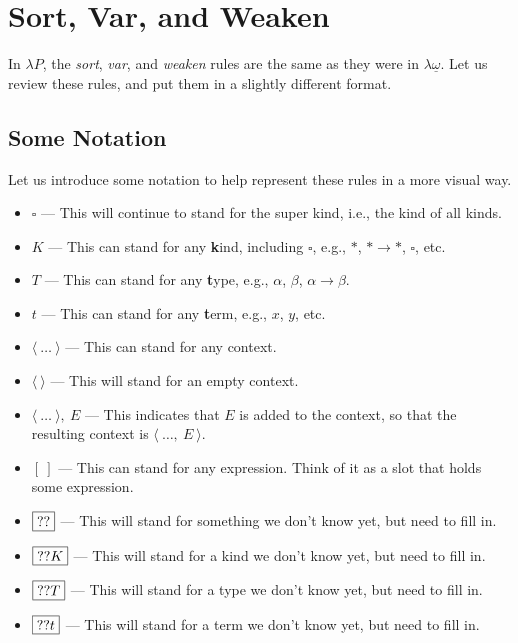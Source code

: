 \documentclass{book}
\numberwithin{equation}{chapter}
\begin{document}
\chapter{Sort, Var, and Weaken}

In $\lambda P$, the \textit{sort}, \textit{var}, and \textit{weaken} rules are the same as they were in $\lambda\underline{\omega}$. Let us review these rules, and put them in a slightly different format.


\section{Some Notation}

Let us introduce some notation to help represent these rules in a more visual way.

\begin{itemize}
\item{$\square$ --- This will continue to stand for the super kind, i.e., the kind of all kinds.}
\item{$K$ --- This can stand for any \textbf{k}ind, including $\square$, e.g., $\ast$, $\ast \rightarrow \ast$, $\square$, etc.}
\item{$T$ --- This can stand for any \textbf{t}ype, e.g., $\alpha$, $\beta$, $\alpha \rightarrow \beta$.}
\item{$t$ --- This can stand for any \textbf{t}erm, e.g., $x$, $y$, etc.}
\item{$\langle~\ldots~\rangle$ --- This can stand for any context.}
\item{$\langle ~ \rangle$ --- This will stand for an empty context.}
\item{$\langle~\ldots~\rangle,~E$ --- This indicates that $E$ is added to the context, so that the resulting context is $\langle~\ldots,~E~\rangle$.} 
\item{$[~]$ --- This can stand for any expression. Think of it as a slot that holds some expression.}
\item{$\framebox{??}$ --- This will stand for something we don't know yet, but need to fill in.}
\item{$\framebox{??$K$}$ --- This will stand for a kind we don't know yet, but need to fill in.}
\item{$\framebox{??$T$}$ --- This will stand for a type we don't know yet, but need to fill in.}
\item{$\framebox{??$t$}$ --- This will stand for a term we don't know yet, but need to fill in.}
\end{itemize}
\end{document}
